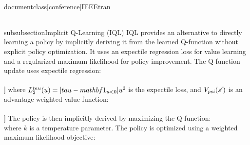 \\documentclass[conference]{IEEEtran}
\begin{document}
\\subsubsection{Implicit Q-Learning (IQL)}
IQL provides an alternative to directly learning a policy by implicitly deriving it from the learned Q-function without explicit policy optimization. It uses an expectile regression loss for value learning and a regularized maximum likelihood for policy improvement.
The Q-function update uses expectile regression:
\\[
L_Q(\\theta) = \\mathbb{E}_{s,a,r,s' \\sim \\mathcal{D}} \\left[ L_2^{\\tau} \\left( Q_{\\theta}(s,a) - (r + \\gamma V_{\\psi}(s')) \\right) \\right]
\\]
where $L_2^{\\tau}(u) = |\\tau - \\mathbf{1}_{u<0}| u^2$ is the expectile loss, and $V_{\\psi}(s')$ is an advantage-weighted value function:
\\[
V_{\\psi}(s') = \\mathbb{E}_{a' \\sim \\pi_{\\beta}} \\left[ Q_{\\theta_{target}}(s',a') - A_{\\theta_{target}}(s',a') \\right]
\\]
The policy is then implicitly derived by maximizing the Q-function:
\\[
\\pi(a|s) \\propto \\exp \\left( \\frac{Q_{\\theta}(s,a) - V_{\\psi}(s)}{k} \\right)
\\]
where $k$ is a temperature parameter. The policy is optimized using a weighted maximum likelihood objective:
\end{document}
